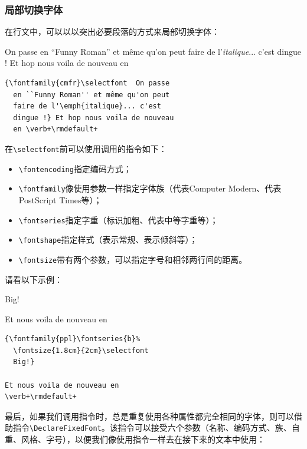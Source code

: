 \subsubsection{局部切换字体}

在行文中，可以以以突出必要段落的方式来局部切换字体：

\begin{codelist}[9.13]{
    { \selectfont  On passe
    en ``Funny Roman'' et même qu'on peut
    faire de l'\emph{italique}... c'est
    dingue !} Et hop nous voila de nouveau
    en 
}\begin{verbatim}
{\fontfamily{cmfr}\selectfont  On passe
  en ``Funny Roman'' et même qu'on peut
  faire de l'\emph{italique}... c'est
  dingue !} Et hop nous voila de nouveau
  en \verb+\rmdefault+
\end{verbatim}
\end{codelist}

在\verb|\selectfont|前可以使用调用的指令如下：

\begin{itemize}
    \item \verb|\fontencoding|指定编码方式；
    \item \verb|\fontfamily|像使用参数一样指定字体族（代表Computer Modern、代表PostScript Times等）；
    \item \verb|\fontseries|指定字重（标识加粗、代表中等字重等）；
    \item \verb|\fontshape|指定样式（表示常规、表示倾斜等）；
    \item \verb|\fontsize|带有两个参数，可以指定字号和相邻两行间的距离。
\end{itemize}

请看以下示例：

\begin{codelist}[9.14]{
    { %
  \fontsize{1.8cm}{2cm}\selectfont
  Big!}
  
Et nous voila de nouveau en
}\begin{verbatim}
{\fontfamily{ppl}\fontseries{b}%
  \fontsize{1.8cm}{2cm}\selectfont
  Big!}

Et nous voila de nouveau en
\verb+\rmdefault+
\end{verbatim}
\end{codelist}

最后，如果我们调用指令时，总是重复使用各种属性都完全相同的字体，则可以借助指令\verb|\DeclareFixedFont|。该指令可以接受六个参数（名称、编码方式、族、自重、风格、字号），以便我们像使用指令一样去在接下来的文本中使用：

